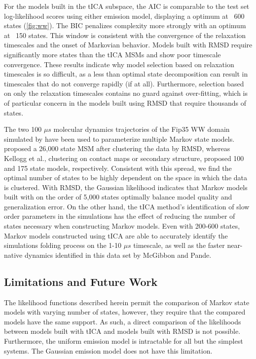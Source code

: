 \documentclass[journal=jpcbfk, layout=twocolumn, manuscript=article]{achemso}
\begin{document}
For the models built in the tICA subspace, the AIC is comparable to the test set log-likelihood scores using either emission model, displaying a optimum at ~600 states (\cref{fig:ww}). The BIC penalizes complexity more strongly with an optimum at ~150 states. This window is consistent with the convergence of the relaxation timescales and the onset of Markovian behavior. Models built with RMSD require significantly more states than the tICA MSMs and show poor timescale convergence. These results indicate why model selection based on relaxation timescales is so difficult, as a less than optimal state decomposition can result in timescales that do not converge rapidly (if at all). Furthermore, selection based on only the relaxation timescales contains no guard against over-fitting, which is of particular concern in the models built using RMSD that require thousands of states.

The two 100 $\mu s$ molecular dynamics trajectories of the Fip35 WW domain simulated by \citet{Shaw2010Atomic} have been used to parameterize multiple Markov state models. \citet{Lane2011Markov} proposed a 26,000 state MSM after clustering the data by RMSD, whereas Kellogg et al.,\cite{Kellogg2012Evaluation} clustering on contact maps or secondary structure, proposed 100 and 175 state models, respectively. Consistent with this spread, we find the optimal number of states to be highly dependent on the space in which the data is clustered. With RMSD, the Gaussian likelihood indicates that Markov models built with on the order of 5,000 states optimally balance model quality and generalization error. On the other hand, the tICA method's identification of slow order parameters in the simulations has the effect of reducing the number of states necessary when constructing Markov models. Even with 200-600 states, Markov models constructed using tICA are able to accurately identify the simulations folding process on the 1-10 $\mu s$ timescale, as well as the faster near-native dynamics identified in this data set by McGibbon and Pande\cite{McGibbon2013Learning}.

\subsection{Limitations and Future Work}

The likelihood functions described herein permit the comparison of Markov state models with varying number of states, however, they require that the compared models have the same support. As such, a direct comparison of the likelihoods between models built with tICA and models built with RMSD is not possible. Furthermore, the uniform emission model is intractable for all but the simplest systems. The Gaussian emission model does not have this limitation.
\end{document}
